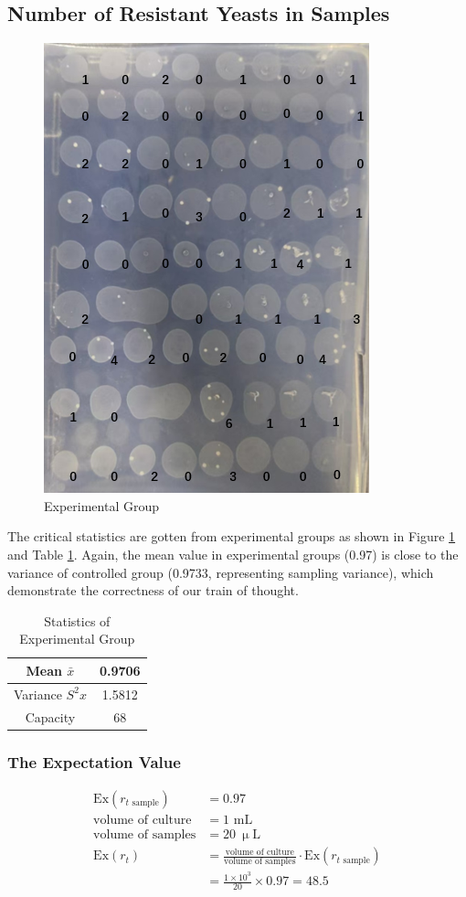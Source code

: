 \documentclass[UTF-8]{article}
\begin{document}
\subsection{Number of Resistant Yeasts in Samples}
\begin{figure}[h]
    \centering
    \includegraphics[width=0.5\linewidth]{../Figures/experimental group.png}
    \caption{Experimental Group}
    \label{experimental group}
\end{figure}
The critical statistics are gotten from experimental groups as shown in Figure \ref{experimental group} and Table \ref{Statistics of Experimental Group}.
Again, the mean value in experimental groups (0.97) is close to the variance of controlled group (0.9733, representing sampling variance), which demonstrate the correctness of our train of thought.

\begin{table}[h]
    \centering
    \begin{tabular}{|c|c|}\hline
        Mean $\bar {x}$ & 0.9706 \\ \hline
        Variance $S^2x$ & 1.5812\\ \hline
        Capacity & 68\\ \hline
    \end{tabular}
    \caption{Statistics of Experimental Group}
    \label{Statistics of Experimental Group}
\end{table}

\subsubsection{The Expectation Value}

\begin{align}
    \text{Ex}(r_{t\text{ sample}})&=0.97 \\
    \text{volume of culture}&=1 \text{ mL}\\
    \text{volume of samples}&=20\ \upmu\text{L}\\
    \text{Ex}(r_t)&=\frac{\text{volume of culture}}{\text{volume of samples}}\cdot \text{Ex}(r_{t\text{ sample}})\\
    &=\frac{1\times 10^3}{20}\times 0.97=48.5
\end{align}
\end{document}
